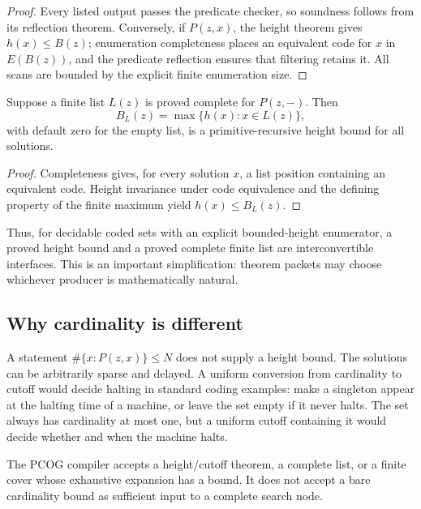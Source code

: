 \begin{proof}
Every listed output passes the predicate checker, so soundness follows from
its reflection theorem.  Conversely, if \(P(z,x)\), the height theorem gives
\(h(x)\leq B(z)\); enumeration completeness places an equivalent code for
\(x\) in \(E(B(z))\), and the predicate reflection ensures that filtering
retains it.  All scans are bounded by the explicit finite enumeration size.
\end{proof}

\begin{theorem}
\label{thm:list-to-height}
Suppose a finite list \(L(z)\) is proved complete for \(P(z,-)\).  Then
\[
 B_L(z)=\max\{h(x):x\in L(z)\},
\]
with default zero for the empty list, is a primitive-recursive height bound for
all solutions.
\end{theorem}

\begin{proof}
Completeness gives, for every solution \(x\), a list position containing an
equivalent code.  Height invariance under code equivalence and the defining
property of the finite maximum yield \(h(x)\leq B_L(z)\).
\end{proof}

Thus, for decidable coded sets with an explicit bounded-height enumerator, a
proved height bound and a proved complete finite list are interconvertible
interfaces.  This is an important simplification: theorem packets may choose
whichever producer is mathematically natural.

\subsection{Why cardinality is different}

A statement \(\#\{x:P(z,x)\}\leq N\) does not supply a height bound.  The
solutions can be arbitrarily sparse and delayed.  A uniform conversion from
cardinality to cutoff would decide halting in standard coding examples: make a
singleton appear at the halting time of a machine, or leave the set empty if it
never halts.  The set always has cardinality at most one, but a uniform cutoff
containing it would decide whether and when the machine halts.

\begin{barrier}
The PCOG compiler accepts a height/cutoff theorem, a complete list, or a finite
cover whose exhaustive expansion has a bound.  It does not accept a bare
cardinality bound as sufficient input to a complete search node.
\end{barrier}

